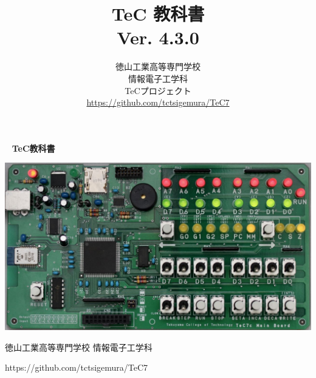\documentclass[a4paper,twocolumn,twoside]{ltjsbook}   %
\newif\ifPDF
\newcommand{\ver}{Ver. 4.3.0}
\begin{document}
\setcounter{page}{0}
\thispagestyle{empty}
\onecolumn
~
\vfill
\vfill
{\noindent
\fontsize{34pt}{50pt}\selectfont\textbf{TeC教科書}
}
\vfill
\vfill
\centerline{
  \includegraphics[scale=0.38]{Img/TeC7c.jpg}
}
\vfill
\vfill
\centerline{\Large 徳山工業高等専門学校 情報電子工学科}
\centerline{\Large\ttfamily https://github.com/tctsigemura/TeC7}
\vfill

\ifPDF
\newpage
\setcounter{page}{0}
\thispagestyle{empty}
\onecolumn
~
\fi

\frontmatter
\title{TeC 教科書\\\ver}
\author{徳山工業高等専門学校\\情報電子工学科\\TeCプロジェクト\\
\url{https://github.com/tctsigemura/TeC7}}
\date{}
\maketitle
\end{document}

